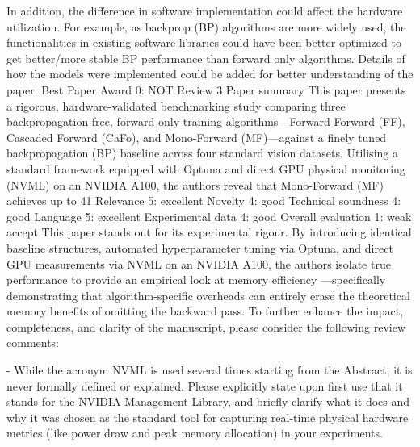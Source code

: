 In addition, the difference in software implementation could affect the hardware utilization. For example, as backprop (BP) algorithms are more widely used, the functionalities in existing software libraries could have been better optimized to get better/more stable BP performance than forward only algorithms. Details of how the models were implemented could be added for better understanding of the paper.
Best Paper Award	
0: NOT
Review 3
Paper summary	This paper presents a rigorous, hardware-validated benchmarking study comparing three backpropagation-free, forward-only training algorithms—Forward-Forward (FF), Cascaded Forward (CaFo), and Mono-Forward (MF)—against a finely tuned backpropagation (BP) baseline across four standard vision datasets. Utilising a standard framework equipped with Optuna and direct GPU physical monitoring (NVML) on an NVIDIA A100, the authors reveal that Mono-Forward (MF) achieves up to 41%
Relevance	
5: excellent
Novelty	
4: good
Technical soundness	
4: good
Language	
5: excellent
Experimental data	
4: good
Overall evaluation	
1: weak accept
This paper stands out for its experimental rigour. By introducing identical baseline structures, automated hyperparameter tuning via Optuna, and direct GPU measurements via NVML on an NVIDIA A100, the authors isolate true performance to provide an empirical look at memory efficiency —specifically demonstrating that algorithm-specific overheads can entirely erase the theoretical memory benefits of omitting the backward pass. To further enhance the impact, completeness, and clarity of the manuscript, please consider the following review comments:

- While the acronym NVML is used several times starting from the Abstract, it is never formally defined or explained. Please explicitly state upon first use that it stands for the NVIDIA Management Library, and briefly clarify what it does and why it was chosen as the standard tool for capturing real-time physical hardware metrics (like power draw and peak memory allocation) in your experiments.

